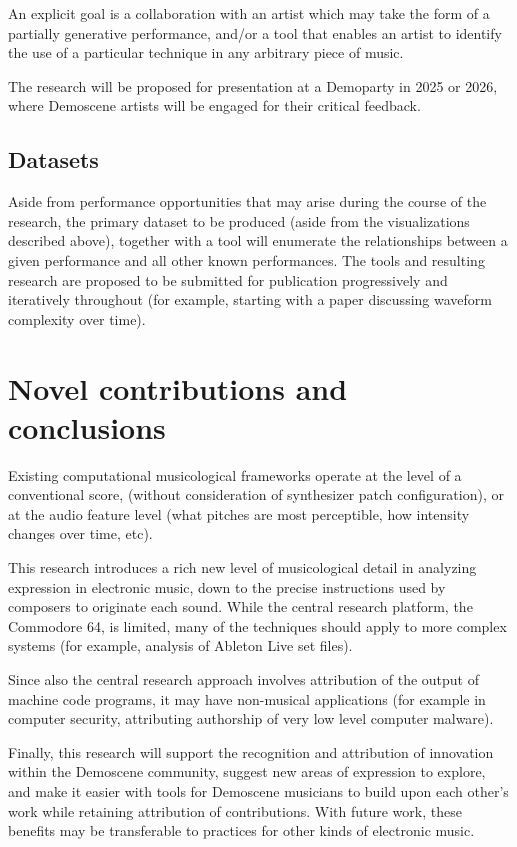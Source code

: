\documentclass[10pt]{article}
\begin{document}
\begin{multicols*}{2}
  An explicit goal is a collaboration with an artist which may take the form of a partially generative performance, and/or a tool that enables an artist to identify the use of a particular technique in any arbitrary piece of music.

  The research will be proposed for presentation at a Demoparty in 2025 or 2026, where Demoscene artists will be engaged for their critical feedback.

  \subsection{Datasets}

Aside from performance opportunities that may arise during the course of the research, the primary dataset to be produced (aside from the visualizations described above), together with a tool will enumerate the relationships between a given performance and all other known performances.	The tools and resulting research are proposed to be submitted for publication progressively and iteratively throughout (for example, starting with a paper discussing waveform complexity over time).

\section{Novel contributions and conclusions}

Existing computational musicological frameworks operate at the level of a conventional score, (without consideration of synthesizer patch configuration), or at the audio feature level (what pitches are most perceptible, how intensity changes over time, etc).

This research introduces a rich new level of musicological detail in analyzing expression in electronic music, down to the precise instructions used by composers to originate each sound. While the central research platform, the Commodore 64, is limited, many of the techniques should apply to more complex systems (for example, analysis of Ableton Live set files).

Since also the central research approach involves attribution of the output of machine code programs, it may have non-musical applications (for example in computer security, attributing authorship of very low level computer malware).

Finally, this research will support the recognition and attribution of innovation within the Demoscene community, suggest new areas of expression to explore, and make it easier with tools for Demoscene musicians to build upon each other’s work while retaining attribution of contributions. With future work, these benefits may be transferable to practices for other kinds of electronic music.




\end{multicols*}

\nocite{*}


\end{document}
